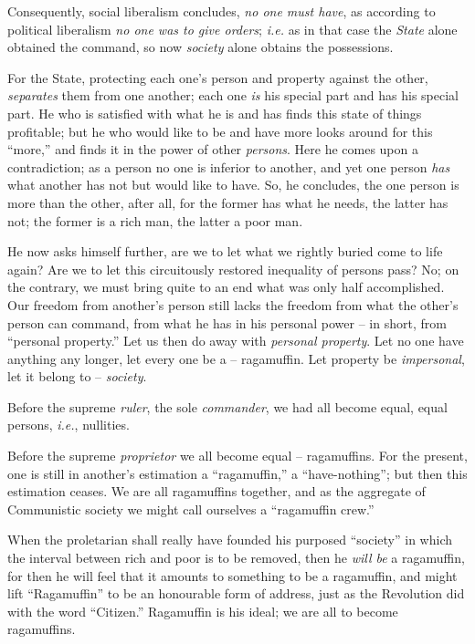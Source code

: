 Consequently, social liberalism concludes, \textit{no one must have}, as 
according to political liberalism \textit{no one was to give orders}; 
\textit{i.e.} as in that case the \textit{State} alone obtained the command, 
so now \textit{society} alone obtains the possessions.

For the State, protecting each one's person and property against the other, 
\textit{separates} them from one another; each one \textit{is} his special 
part and has his special part. He who is satisfied with what he is and has 
finds this state of things profitable; but he who would like to be and have 
more looks around for this ``more,'' and finds it in the power of other 
\textit{persons}. Here he comes upon a contradiction; as a person no one is 
inferior to another, and yet one person \textit{has} what another has not but 
would like to have. So, he concludes, the one person is more than the other, 
after all, for the former has what he needs, the latter has not; the former is 
a rich man, the latter a poor man.

He now asks himself further, are we to let what we rightly buried come to life 
again? Are we to let this circuitously restored inequality of persons pass? 
No; on the contrary, we must bring quite to an end what was only half 
accomplished. Our freedom from another's person still lacks the freedom from 
what the other's person can command, from what he has in his personal power -- 
in short, from ``personal property.'' Let us then do away with 
\textit{personal property}. Let no one have anything any longer, let every one 
be a -- ragamuffin. Let property be \textit{impersonal}, let it belong to -- 
\textit{society}.

Before the supreme \textit{ruler}, the sole \textit{commander}, we had all 
become equal, equal persons, \textit{i.e.}, nullities.

Before the supreme \textit{proprietor} we all become equal -- ragamuffins. For 
the present, one is still in another's estimation a ``ragamuffin,'' a 
``have-nothing''; but then this estimation ceases. We are all ragamuffins 
together, and as the aggregate of Communistic society we might call ourselves 
a ``ragamuffin crew.''

When the proletarian shall really have founded his purposed ``society'' in 
which the interval between rich and poor is to be removed, then he 
\textit{will be} a ragamuffin, for then he will feel that it amounts to 
something to be a ragamuffin, and might lift ``Ragamuffin'' to be an 
honourable form of address, just as the Revolution did with the word 
``Citizen.'' Ragamuffin is his ideal; we are all to become ragamuffins.


